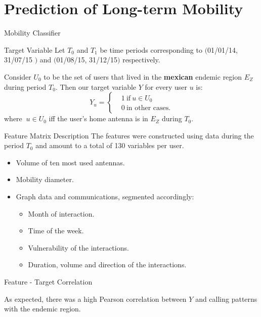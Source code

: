 \documentclass{beamer}
\begin{document}
\section{Prediction of Long-term Mobility}
\begin{frame}{Mobility Classifier}
			\begin{block}{Target Variable}
			Let $T_0$ and $T_1$ be time periods corresponding to $($01/01/14, 31/07/15 $)$ and $($01/08/15, 31/12/15$)$ respectively.

			Consider $U_0$ to be the set of users that lived in the \textbf{mexican} endemic region $E_Z$ during period $T_0$. Then our target variable $Y$ for every user $u$ is:
			\[
			Y_u =
			\begin{cases}
			&1 \ \mbox{if} \ u \in U_0  \\
			&0 \ \mbox{in other cases}.
			\end{cases}
			\]
			where $\ u \in U_0$ iff the user's home antenna is in $E_Z$ during $T_0$.
			\end{block}

\end{frame}

\begin{frame}{Feature Matrix Description}
	The features were constructed using data during the period $T_0$ and amount to a total of 130 variables per user.

	\begin{itemize}
		\item Volume of ten most used antennas.
		\item Mobility diameter.
		\item Graph data and communications, segmented accordingly:
		\begin{itemize}
			\item Month of interaction.
			\item Time of the week.
			\item Vulnerability of the interactions.
			\item Duration, volume and direction of the interactions.
		\end{itemize}
	\end{itemize}

	\begin{block}{Feature - Target Correlation}

	As expected, there was a high Pearson correlation between $Y$ and calling patterns with the endemic region.
	\end{block}

\end{frame}
\end{document}

